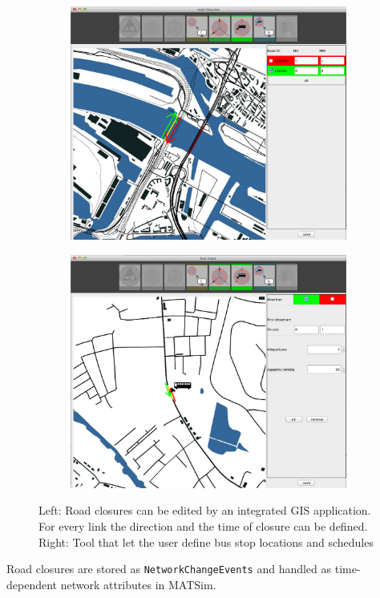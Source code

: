 \begin{figure}
\begin{subfigure}
\centering
\includegraphics[width=.475\linewidth]{extending/figures/Evacuation/rd_closure_detail}
\end{subfigure}\hfill
\begin{subfigure}
\centering
\includegraphics[width=.475\linewidth]{extending/figures/Evacuation/bus_stops}
\end{subfigure}
\caption{Left: Road closures can be edited by an integrated GIS application. For every link the direction and the time of closure can be defined. Right: Tool that let the user define bus stop locations and schedules }\label{chap:evac:fig:rd_closures_bus_stops}
\end{figure}
Road closures are stored as \lstinline+NetworkChangeEvents+ and handled as time-dependent network attributes in MATSim.

